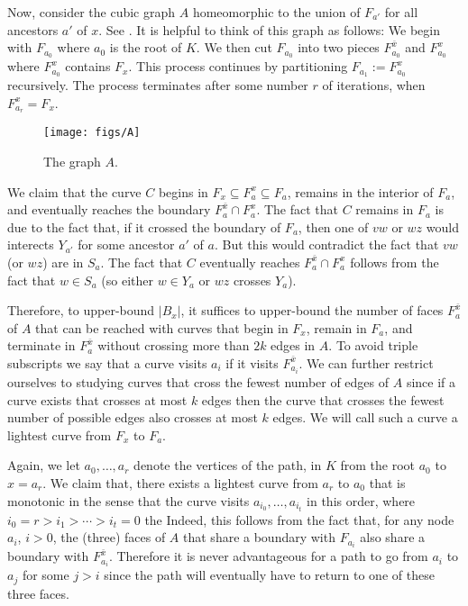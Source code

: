 \documentclass{patmorin}
\begin{document}
Now, consider the cubic graph $A$ homeomorphic to the union of $F_{a'}$ for all ancestors $a'$ of $x$. See .  It is helpful to think of this graph as follows:  We begin with $F_{a_0}$ where $a_0$ is the root of $K$.  We then cut $F_{a_0}$ into two pieces $F^{\bar{x}}_{a_0}$ and $F^x_{a_0}$ where $F^x_{a_0}$ contains $F_x$.  This process continues by partitioning $F_{a_1}:=F^x_{a_0}$ recursively.  The process terminates after some number $r$ of iterations, when $F^x_{a_r}=F_x$.

\begin{figure}
  \begin{center}
    \texttt{[image: figs/A]}
  \end{center}
  \caption{The graph $A$.}
\end{figure}

We claim that the curve $C$ begins in $F_x\subseteq F^x_a\subseteq F_a$, remains in the interior of $F_a$, and eventually reaches the boundary $F^{\bar{x}}_a\cap F^x_a$.  The fact that $C$ remains in $F_a$ is due to the fact that, if it crossed the boundary of $F_a$, then one of $vw$ or $wz$ would interects $Y_{a'}$ for some ancestor $a'$ of $a$.  But this would contradict the fact that $vw$ (or $wz$) are in $S_a$. The fact that $C$ eventually reaches $F^{\bar{x}}_a\cap F^x_a$ follows from the fact that $w\in S_a$ (so either $w\in Y_a$ or $wz$ crosses $Y_a$).

Therefore, to upper-bound $|B_x|$, it suffices to upper-bound the number of faces $F^{\bar{x}}_a$ of $A$ that can be reached with curves that begin in $F_x$, remain in $F_a$, and terminate in $F^{\bar{x}}_a$ without crossing more than $2k$ edges in $A$.  To avoid triple subscripts we say that a curve visits $a_i$ if it visits $F^{\bar{x}}_{a_i}$.  We can further restrict ourselves to studying curves that cross the fewest number of edges of $A$ since if a curve exists that crosses at most $k$ edges then the curve that crosses the fewest number of possible edges also crosses at most $k$ edges.  We will call such a curve a lightest curve from $F_x$ to $F_a$.

Again, we let $a_0,\ldots,a_r$ denote the vertices of the path, in $K$ from the root $a_0$ to $x=a_r$.  We claim that, there exists a lightest curve from $a_r$ to $a_0$ that is monotonic in the sense that the curve visits $a_{i_0},\ldots,a_{i_t}$ in this order, where $i_0=r > i_1>\cdots>i_t=0$ the Indeed, this follows from the fact that, for any node $a_i$, $i>0$, the (three) faces of $A$ that share a boundary with $F_{a_i}$ also share a boundary with $F^{\bar{x}}_{a_i}$.  Therefore it is never advantageous for a path to go from $a_i$ to $a_j$ for some $j>i$ since the path will eventually have to return to one of these three faces.
\end{document}
